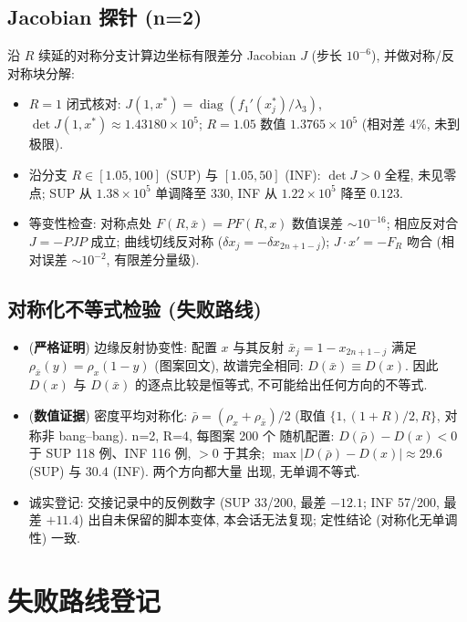 \documentclass[UTF8]{ctexart}
\newcommand{\STRICT}{\textbf{严格证明}}
\newcommand{\EVIDENCE}{\textbf{数值证据}}
\begin{document}
\subsection{Jacobian 探针 (n=2)}

沿 $R$ 续延的对称分支计算边坐标有限差分 Jacobian $J$ (步长 $10^{-6}$),
并做对称/反对称块分解:
\begin{itemize}
	\item $R=1$ 闭式核对: $J(1,x^*)=\operatorname{diag}(f_1'(x_j^*)/\lambda_3)$,
	$\det J(1,x^*)\approx1.43180\times10^5$; $R=1.05$ 数值
	$1.3765\times10^5$ (相对差 $4\%$, 未到极限).
	\item 沿分支 $R\in[1.05,100]$ (SUP) 与 $[1.05,50]$ (INF):
	$\det J>0$ 全程, 未见零点; SUP 从 $1.38\times10^5$ 单调降至 $330$,
	INF 从 $1.22\times10^5$ 降至 $0.123$.
	\item 等变性检查: 对称点处 $F(R,\bar x)=PF(R,x)$ 数值误差 $\sim10^{-16}$;
	相应反对合 $J=-PJP$ 成立; 曲线切线反对称 ($\delta x_j=-\delta x_{2n+1-j}$);
	$J\cdot x'=-F_R$ 吻合 (相对误差 $\sim10^{-2}$, 有限差分量级).
\end{itemize}

\subsection{对称化不等式检验 (失败路线)}

\begin{itemize}
	\item (\STRICT) 边缘反射协变性: 配置 $x$ 与其反射 $\bar x_j=1-x_{2n+1-j}$
	满足 $\rho_{\bar x}(y)=\rho_x(1-y)$ (图案回文), 故谱完全相同:
	$D(\bar x)\equiv D(x)$. 因此 $D(x)$ 与 $D(\bar x)$ 的逐点比较是恒等式,
	不可能给出任何方向的不等式.
	\item (\EVIDENCE) 密度平均对称化: $\bar\rho=(\rho_x+\rho_{\bar x})/2$
	(取值 $\{1,(1+R)/2,R\}$, 对称非 bang--bang). n=2, R=4, 每图案 200 个
	随机配置: $D(\bar\rho)-D(x)<0$ 于 SUP 118 例、INF 116 例, $>0$ 于其余;
	$\max|D(\bar\rho)-D(x)|\approx29.6$ (SUP) 与 $30.4$ (INF). 两个方向都大量
	出现, 无单调不等式.
	\item 诚实登记: 交接记录中的反例数字 (SUP 33/200, 最差 $-12.1$; INF
	57/200, 最差 $+11.4$) 出自未保留的脚本变体, 本会话无法复现; 定性结论
	(对称化无单调性) 一致.
\end{itemize}

\section{失败路线登记}\label{sec:failures}
\end{document}
